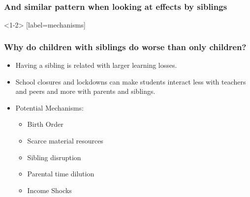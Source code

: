 \documentclass{beamer}
\begin{document}
\begin{frame}
    \label{frame:twfe_gpa_controls_siblings}
    \frametitle{And similar pattern when looking at effects by siblings}
        {
    }

    \begin{flushleft}
        \hyperlink{frame:twfe_gpa_controls}{}
    \end{flushleft}       

\end{frame}



\begin{frame}<1-2>
    [label=mechanisms]
    \frametitle{Why do children with siblings do worse than only children?}
\begin{itemize}
    \item Having a sibling is related with larger learning losses.
    \item School closures and lockdowns can make students interact less with teachers and peers and more with parents and siblings.
    \item Potential Mechanisms:   
    \begin{itemize}
        \item {}Birth Order
        \item {}Scarce material resources
        \item {}Sibling disruption
        \item {}Parental time dilution
        \item {}Income Shocks
    \end{itemize} 
\end{itemize}
\end{frame}
\end{document}
